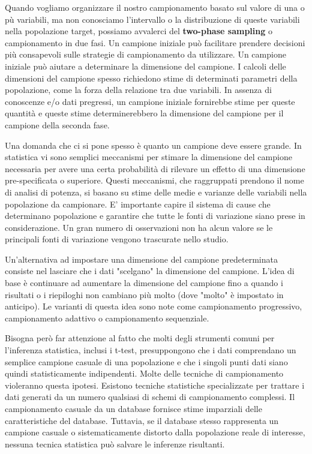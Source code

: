 \documentclass[a4paper]{extarticle}
\begin{document}
Quando vogliamo organizzare il nostro campionamento basato sul valore di una o pù variabili, ma non conosciamo l'intervallo o la distribuzione di queste variabili nella popolazione target, possiamo avvalerci del \textbf{two-phase sampling} o campionamento in due fasi. Un campione iniziale può facilitare prendere decisioni più consapevoli sulle strategie di campionamento da utilizzare.
Un campione iniziale può aiutare a determinare la dimensione del campione. I calcoli delle dimensioni del campione spesso richiedono stime di determinati parametri della popolazione, come la forza della relazione tra due variabili. In assenza di conoscenze e/o dati pregressi, un campione iniziale fornirebbe stime per queste quantità e queste stime determinerebbero la dimensione del campione per il campione della seconda fase.

Una domanda che ci si pone spesso è quanto un campione deve essere grande. In statistica vi sono semplici meccanismi per stimare la dimensione del campione necessaria per avere una certa probabilità di rilevare un effetto di una dimensione pre-specificata o superiore. Questi meccanismi, che raggruppati prendono il nome di analisi di potenza, si basano su stime delle medie e varianze delle variabili nella popolazione da campionare. E' importante capire il sistema di cause che determinano popolazione e garantire che tutte le fonti di variazione siano prese in considerazione. Un gran numero di osservazioni non ha alcun valore se le principali fonti di variazione vengono trascurate nello studio.

Un'alternativa ad impostare una dimensione del campione predeterminata consiste nel lasciare che i dati "scelgano" la dimensione del campione. L'idea di base è continuare ad aumentare la dimensione del campione fino a quando i risultati o i riepiloghi non cambiano più molto (dove "molto" è impostato in anticipo). Le varianti di questa idea sono note come campionamento progressivo, campionamento adattivo o campionamento sequenziale.

Bisogna però far attenzione al fatto che molti degli strumenti comuni per l'inferenza statistica, inclusi i t-test, presuppongono che i dati comprendano un semplice campione casuale di una popolazione e che i singoli punti dati siano quindi statisticamente indipendenti. Molte delle tecniche di campionamento violeranno questa ipotesi. Esistono tecniche statistiche specializzate per trattare i dati generati da un numero qualsiasi di schemi di campionamento complessi. Il campionamento casuale da un database fornisce stime imparziali delle caratteristiche del database. Tuttavia, se il database stesso rappresenta un campione casuale o sistematicamente distorto dalla popolazione reale di interesse, nessuna tecnica statistica può salvare le inferenze risultanti.
\end{document}
